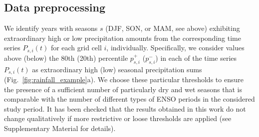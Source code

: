 \documentclass[utf8]{frontiersSCNS} %
\begin{document}


\subsection{Data preprocessing}\label{sec:preprocessing}

We identify years with seasons $s$ (DJF, SON, or MAM, see above) exhibiting extraordinary high or low precipitation amounts from the corresponding time series $P_{s,i}(t)$ for each grid cell $i$, individually. Specifically, we consider values above (below) the 80th (20th) percentile $p_{s,i}^+$ ($p_{s,i}^-$) in each of the time series $P_{s,i}(t)$ as extraordinary high (low) seasonal precipitation sums (Fig.~\ref{fig:rainfall_example}a). We choose these particular thresholds to ensure the presence of a sufficient number of particularly dry and wet seasons that is comparable with the number of different types of ENSO periods in the considered study period. It has been checked that the results obtained in this work do not change qualitatively if more restrictive or loose thresholds are applied (see Supplementary Material for details).
\end{document}
